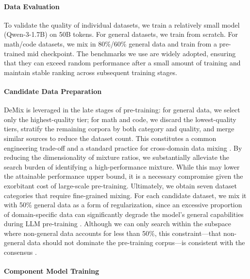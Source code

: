 \paragraph{Data Evaluation} To validate the quality of individual datasets, we train a relatively small model (Qwen-3-1.7B) on 50B tokens. For general datasets, we train from scratch. For math/code datasets, we mix in 80\%/60\% general data and train from a pre-trained mid checkpoint. The benchmarks we use are widely adopted, ensuring that they can exceed random performance after a small amount of training and maintain stable ranking across subsequent training stages.

\paragraph{Candidate Data Preparation}

DeMix is leveraged in the late stages of pre-training: for general data, we select only the highest-quality tier; for math and code, we discard the lowest-quality tiers, stratify the remaining corpora by both category and quality, and merge similar sources to reduce the dataset count. This constitutes a common engineering trade-off \cite{diao2025climb} and a standard practice for cross-domain data mixing \cite{basant2025nvidia, feng2024maximize}. By reducing the dimensionality of mixture ratios, we substantially alleviate the search burden of identifying a high-performance mixture. While this may lower the attainable performance upper bound, it is a necessary compromise given the exorbitant cost of large-scale pre-training.
Ultimately, we obtain seven dataset categories that require fine-grained mixing.
For each candidate dataset, we mix it with 50\% general data as a form of regularization, since an excessive proportion of domain-specific data can significantly degrade the model’s general capabilities during LLM pre-training \cite{lin2025rec, bansal2025context, allal2025_the_smol_training_playbook_the_secrets_to_building_world_class_llms}.
Although we can only search within the subspace where non-general data accounts for less than 50\%, this constraint—that non-general data should not dominate the pre-training corpus—is consistent with the consensus \cite{basant2025nvidia, blakeman2025nemotron, allal2025smollm2}.

\paragraph{Component Model Training} 

